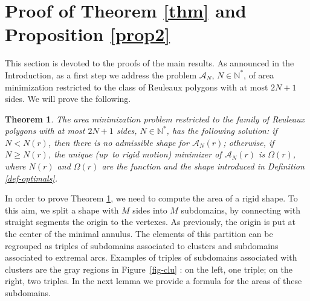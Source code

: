\documentclass[JEP,XML,SOM,Unicode,NoFloatCountersInSection]{cedram}
\let\mathcal\mathscr
\theoremstyle{plain}
\newtheorem{theorem}{Theorem}[section]
\theoremstyle{definition}
\newcommand\A{\mathcal A}
\begin{document}
\section{Proof of Theorem \ref{thm} and Proposition \ref{prop2}}\label{sec-proof}

This section is devoted to the proofs of the main results. As announced in the Introduction, as a first step we address the problem $\A_N$, $N\in \mathbb N^*$, of area minimization restricted to the class of Reuleaux polygons with at most $2N+1$ sides. We will prove the following.

\begin{theorem}\label{thm-density}
The area minimization problem restricted to the family of Reuleaux polygons with at most $2N+1$ sides, $N\in \mathbb N^*$, has the following solution: {if $N<N(r)$, then there is no admissible shape for $\A_N(r)$; otherwise, if $N\geq N(r)$, the unique (up~to rigid motion) minimizer of $\A_N(r)$ is $\Omega(r)$,}
where $N(r)$ and $\Omega(r)$ are the function and the shape introduced in Definition \ref{def-optimals}.
\end{theorem}
In order to prove Theorem \ref{thm-density}, we need to compute the area of a rigid shape. To this aim, we split a shape with $M$ sides into $M$ subdomains, by connecting with straight segments the origin to the vertexes. As previously, the origin is put at the center
of the minimal annulus. The elements of this partition can be regrouped as triples of subdomains associated to clusters and subdomains associated to extremal arcs. {Examples of triples of subdomains associated with clusters are the gray regions in Figure~\ref{fig-clu} : on the left, one triple; on the right, two triples.} In the next lemma we provide a formula for the areas of these subdomains.
\end{document}

